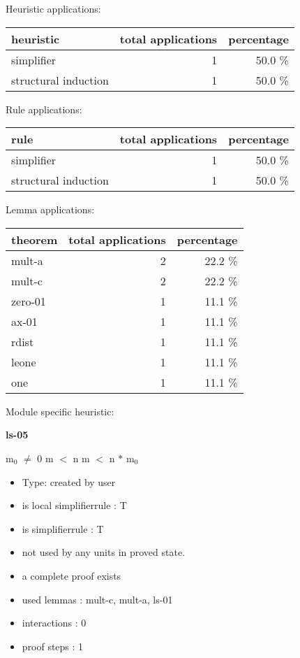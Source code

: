 \documentclass[a4paper]{article}
\begin{document}
\medskip


Heuristic applications:

\begin{supertabular}{l|r|r}
heuristic	& total applications & percentage \\ \hline
simplifier & 1 & 50.0 \% \\
structural induction & 1 & 50.0 \% \\

\end{supertabular}

Rule applications:

\begin{supertabular}{l|r|r}
rule	        & total applications & percentage \\ \hline
simplifier & 1 & 50.0 \% \\
structural induction & 1 & 50.0 \% \\

\end{supertabular}

Lemma applications:

\begin{supertabular}{l|r|r}
theorem	        & total applications & percentage \\ \hline
mult-a & 2 & 22.2 \% \\
mult-c & 2 & 22.2 \% \\
zero-01 & 1 & 11.1 \% \\
ax-01 & 1 & 11.1 \% \\
rdist & 1 & 11.1 \% \\
leone & 1 & 11.1 \% \\
one & 1 & 11.1 \% \\

\end{supertabular}

Module specific heuristic:

\pagebreak

{\LARGE\bf ls-05}\label{lemma-ls-05}

\medskip

 \Fol $\mbox{m}_{0}$ $\neq$ 0 \And m $<$ n \Imp m $<$ n $*$ $\mbox{m}_{0}$

\begin{itemize}

\item Type: created by user

\item is local simplifierrule : T
\item is simplifierrule : T
\item not used by any units in proved state.
\item       a complete proof exists
\item       used lemmas  : mult-c, mult-a, ls-01
\item       interactions : 0
\item       proof steps  : 1
\end{itemize}
\end{document}
